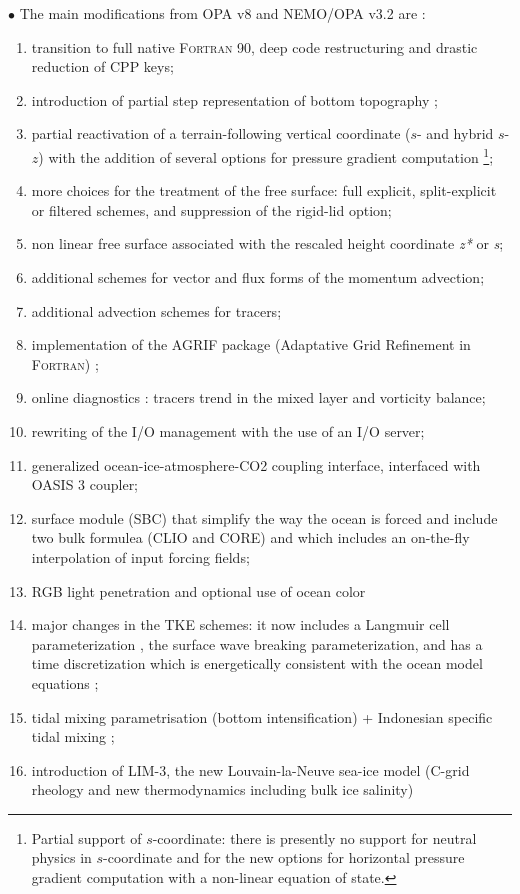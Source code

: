 \documentclass[../main/NEMO_manual]{subfiles}
\begin{document}
$\bullet$ The main modifications from OPA v8 and NEMO/OPA v3.2 are :\\
\begin{enumerate}
\item
  transition to full native \textsc{Fortran} 90, deep code restructuring and drastic reduction of CPP keys; 
\item
  introduction of partial step representation of bottom topography
  \citep{Barnier_al_OD06, Le_Sommer_al_OM09, Penduff_al_OS07};
\item
  partial reactivation of a terrain-following vertical coordinate ($s$- and hybrid $s$-$z$) with
  the addition of several options for pressure gradient computation
  \footnote{Partial support of $s$-coordinate: there is presently no support for neutral physics in
    $s$-coordinate and for the new options for horizontal pressure gradient computation with
    a non-linear equation of state.
  };
\item
  more choices for the treatment of the free surface: full explicit, split-explicit or filtered schemes,
  and suppression of the rigid-lid option;
\item
  non linear free surface associated with the rescaled height coordinate \textit{z*} or \textit{s};
\item
  additional schemes for vector and flux forms of the momentum advection;
\item
  additional advection schemes for tracers;
\item
  implementation of the AGRIF package (Adaptative Grid Refinement in \textsc{Fortran}) \citep{Debreu_al_CG2008};
\item
  online diagnostics : tracers trend in the mixed layer and vorticity balance;
\item
  rewriting of the I/O management with the use of an I/O server;
\item
  generalized ocean-ice-atmosphere-CO2 coupling interface, interfaced with OASIS 3 coupler;
\item
  surface module (SBC) that simplify the way the ocean is forced and include two bulk formulea (CLIO and CORE) and
  which includes an on-the-fly interpolation of input forcing fields;
\item
  RGB light penetration and optional use of ocean color 
\item
  major changes in the TKE schemes: it now includes a Langmuir cell parameterization \citep{Axell_JGR02},
  the \citet{Mellor_Blumberg_JPO04} surface wave breaking parameterization, and has a time discretization which
  is energetically consistent with the ocean model equations \citep{Burchard_OM02, Marsaleix_al_OM08};
\item
  tidal mixing parametrisation (bottom intensification) + Indonesian specific tidal mixing
  \citep{Koch-Larrouy_al_GRL07};
\item
  introduction of LIM-3, the new Louvain-la-Neuve sea-ice model
  (C-grid rheology and new thermodynamics including bulk ice salinity)
  \citep{Vancoppenolle_al_OM09a, Vancoppenolle_al_OM09b}
\end{enumerate}
\end{document}
